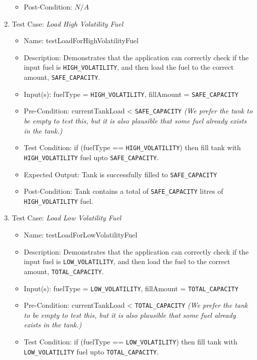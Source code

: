 \documentclass{article}
\begin{document}
\begin{enumerate}
\begin{itemize}
            \item Post-Condition: $N/A$
        \end{itemize}
    \item Test Case: \textit{Load High Volatility Fuel}
        \begin{itemize}
            \item Name: testLoadForHighVolatilityFuel
            \item Description: Demonstrates that the application can correctly check if the input fuel is \texttt{HIGH\_VOLATILITY}, and then load the fuel to the correct amount, \texttt{SAFE\_CAPACITY}.
            \item Input(s): fuelType = \texttt{HIGH\_VOLATILITY}, fillAmount = \texttt{SAFE\_CAPACITY}
            \item Pre-Condition: currentTankLoad < \texttt{SAFE\_CAPACITY} \textit{(We prefer the tank to be empty to test this, but it is also plausible that some fuel already exists in the tank.)}
            \item Test Condition: if (fuelType == \texttt{HIGH\_VOLATILITY}) then fill tank with \texttt{HIGH\_VOLATILITY} fuel upto \texttt{SAFE\_CAPACITY}.
            \item Expected Output: Tank is successfully filled to \texttt{SAFE\_CAPACITY}
            \item Post-Condition: Tank contains a total of \texttt{SAFE\_CAPACITY} litres of \texttt{HIGH\_VOLATILITY} fuel.
        \end{itemize}
    \item Test Case: \textit{Load Low Volatility Fuel}
        \begin{itemize}
            \item Name: testLoadForLowVolatilityFuel
            \item Description: Demonstrates that the application can correctly check if the input fuel is \texttt{LOW\_VOLATILITY}, and then load the fuel to the correct amount, \texttt{TOTAL\_CAPACITY}.
            \item Input(s): fuelType = \texttt{LOW\_VOLATILITY}, fillAmount = \texttt{TOTAL\_CAPACITY}
            \item Pre-Condition: currentTankLoad < \texttt{TOTAL\_CAPACITY} \textit{(We prefer the tank to be empty to test this, but it is also plausible that some fuel already exists in the tank.)}
            \item Test Condition: if (fuelType == \texttt{LOW\_VOLATILITY}) then fill tank with \texttt{LOW\_VOLATILITY} fuel upto \texttt{TOTAL\_CAPACITY}.

\end{itemize}
\end{enumerate}
\end{document}
